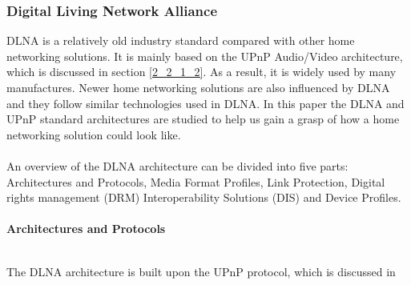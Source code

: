 \subsubsection[DLNA]{Digital Living Network Alliance\label{2_2_2}} 
DLNA is a relatively old industry standard compared with other home networking 
solutions. It is mainly based on the UPnP Audio/Video architecture, which is 
discussed in section \ref{2_2_1_2}. As a result, it is widely used by many manufactures. Newer 
home networking solutions are also influenced by DLNA and they follow similar 
technologies used in DLNA. In this paper the DLNA and UPnP standard architectures are studied to help us gain a grasp of how a home networking solution could look like. \\
\\
An overview of the DLNA architecture \cite{dlna_guideline} can be divided into
five parts: Architectures and Protocols, Media Format Profiles, Link Protection,
Digital rights management (DRM) Interoperability Solutions (DIS) and Device
Profiles.\\
\\
\textbf{Architectures and Protocols}\\ 
\begin{table}[htb] 
\caption{Key Technology Ingredients \label{dlna_key_tech}} 
\begin{center} 
\end{center} 
\end{table} 
\\The DLNA architecture is built upon the UPnP protocol, which is discussed in
